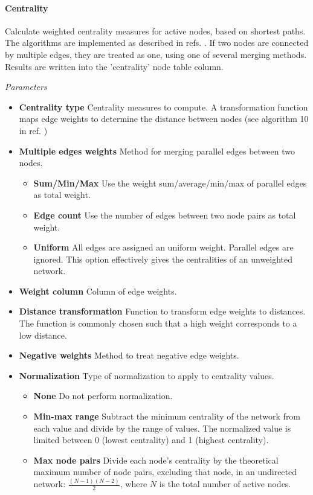 \paragraph{Centrality} Calculate weighted centrality measures for active nodes, based on shortest paths. The algorithms are implemented as described in refs. \cite{Brandes2008,delSol2006}. If two nodes are connected by multiple edges, they are treated as one, using one of several merging methods. Results are written into the 'centrality' node table column.

\textit{Parameters}
\begin{itemize}
\item \textbf{Centrality type} Centrality measures to compute. A transformation function maps edge weights to determine the distance between nodes (see algorithm 10 in ref. \cite{Brandes2008})
\item \textbf{Multiple edges weights} Method for merging parallel edges between two nodes. 
  \begin{itemize}
  \item \textbf{Sum/Min/Max} Use the weight sum/average/min/max of parallel edges as total weight. 
  \item \textbf{Edge count} Use the number of edges between two node pairs as total weight. 
  \item \textbf{Uniform} All edges are assigned an uniform weight. Parallel edges are ignored. This option effectively gives the centralities of an unweighted network.
  \end{itemize}
\item \textbf{Weight column} Column of edge weights. 
\item \textbf{Distance transformation} Function to transform edge weights to distances. The function is commonly chosen such that a high weight corresponds to a low distance.
\item \textbf{Negative weights} Method to treat negative edge weights.
\item \textbf{Normalization} Type of normalization to apply to centrality values.
  \begin{itemize}
  \item \textbf{None} Do not perform normalization.
  \item \textbf{Min-max range} Subtract the minimum centrality of the network from each value and divide by the range of values. The normalized value is limited between 0 (lowest centrality) and 1 (highest centrality).
    \item \textbf{Max node pairs} Divide each node's centrality by the theoretical maximum number of node pairs, excluding that node, in an undirected network: $\frac{(N-1)(N-2)}{2}$, where $N$ is the total number of active nodes.
  \end{itemize}
\end{itemize}

